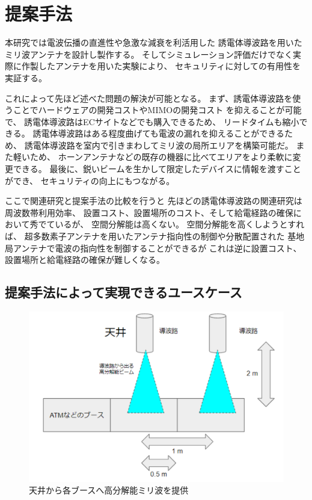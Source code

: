 \documentclass[technicalreport]{ieicej}
\begin{document}
\section{提案手法}

本研究では電波伝播の直進性や急激な減衰を利活用した
誘電体導波路を用いたミリ波アンテナを設計し製作する。
そしてシミュレーション評価だけでなく実際に作製したアンテナを用いた実験により、
セキュリティに対しての有用性を実証する。

これによって先ほど述べた問題の解決が可能となる。
まず、誘電体導波路を使うことでハードウェアの開発コストやMIMOの開発コスト
を抑えることが可能で、
誘電体導波路はECサイトなどでも購入できるため、
リードタイムも縮小できる。
誘電体導波路はある程度曲げても電波の漏れを抑えることができるため、
誘電体導波路を室内で引きまわしてミリ波の局所エリアを構築可能だ。
また軽いため、
ホーンアンテナなどの既存の機器に比べてエリアをより柔軟に変更できる。
最後に、鋭いビームを生かして限定したデバイスに情報を渡すことができ、
セキュリティの向上にもつながる。


ここで関連研究と提案手法の比較を行うと
先ほどの誘電体導波路の関連研究は周波数帯利用効率、
設置コスト、設置場所のコスト、そして給電経路の確保において秀でているが、
空間分解能は高くない。
空間分解能を高くしようとすれば、
超多数素子アンテナを用いたアンテナ指向性の制御や分散配置された
基地局アンテナで電波の指向性を制御することができるが
これは逆に設置コスト、設置場所と給電経路の確保が難しくなる。

\subsection{提案手法によって実現できるユースケース}

\begin{figure}[tb]
  \vspace{20mm}
  \begin{center}
    \includegraphics[bb=0 0 384 262, width=0.7\linewidth]{img/usecase.pdf}
    \caption{天井から各ブースへ高分解能ミリ波を提供}
    \label{fig:usecase}
  \end{center}
\end{figure}
\end{document}
